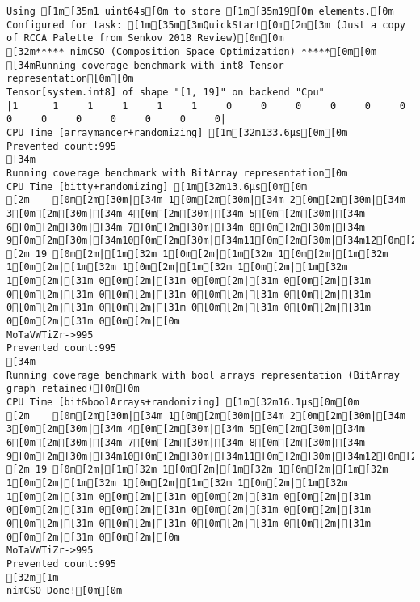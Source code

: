 \begin{verbatim}
Using [1m[35m1 uint64s[0m to store [1m[35m19[0m elements.[0m
Configured for task: [1m[35m[3mQuickStart[0m[2m[3m (Just a copy of RCCA Palette from Senkov 2018 Review)[0m[0m
[32m***** nimCSO (Composition Space Optimization) *****[0m[0m
[34mRunning coverage benchmark with int8 Tensor representation[0m[0m
Tensor[system.int8] of shape "[1, 19]" on backend "Cpu"
|1      1     1     1     1     1     0     0     0     0     0     0     0     0     0     0     0     0     0|
CPU Time [arraymancer+randomizing] [1m[32m133.6μs[0m[0m
Prevented count:995
[34m
Running coverage benchmark with BitArray representation[0m
CPU Time [bitty+randomizing] [1m[32m13.6μs[0m[0m
[2m    [0m[2m[30m|[34m 1[0m[2m[30m|[34m 2[0m[2m[30m|[34m 3[0m[2m[30m|[34m 4[0m[2m[30m|[34m 5[0m[2m[30m|[34m 6[0m[2m[30m|[34m 7[0m[2m[30m|[34m 8[0m[2m[30m|[34m 9[0m[2m[30m|[34m10[0m[2m[30m|[34m11[0m[2m[30m|[34m12[0m[2m[30m|[34m13[0m[2m[30m|[34m14[0m[2m[30m|[34m15[0m[2m[30m|[34m16[0m[2m[30m|[34m17[0m[2m[30m|[34m18[0m[2m[30m|[34m19[0m[2m|[0m
[2m 19 [0m[2m|[1m[32m 1[0m[2m|[1m[32m 1[0m[2m|[1m[32m 1[0m[2m|[1m[32m 1[0m[2m|[1m[32m 1[0m[2m|[1m[32m 1[0m[2m|[31m 0[0m[2m|[31m 0[0m[2m|[31m 0[0m[2m|[31m 0[0m[2m|[31m 0[0m[2m|[31m 0[0m[2m|[31m 0[0m[2m|[31m 0[0m[2m|[31m 0[0m[2m|[31m 0[0m[2m|[31m 0[0m[2m|[31m 0[0m[2m|[31m 0[0m[2m|[0m
MoTaVWTiZr->995
Prevented count:995
[34m
Running coverage benchmark with bool arrays representation (BitArray graph retained)[0m[0m
CPU Time [bit&boolArrays+randomizing] [1m[32m16.1μs[0m[0m
[2m    [0m[2m[30m|[34m 1[0m[2m[30m|[34m 2[0m[2m[30m|[34m 3[0m[2m[30m|[34m 4[0m[2m[30m|[34m 5[0m[2m[30m|[34m 6[0m[2m[30m|[34m 7[0m[2m[30m|[34m 8[0m[2m[30m|[34m 9[0m[2m[30m|[34m10[0m[2m[30m|[34m11[0m[2m[30m|[34m12[0m[2m[30m|[34m13[0m[2m[30m|[34m14[0m[2m[30m|[34m15[0m[2m[30m|[34m16[0m[2m[30m|[34m17[0m[2m[30m|[34m18[0m[2m[30m|[34m19[0m[2m|[0m
[2m 19 [0m[2m|[1m[32m 1[0m[2m|[1m[32m 1[0m[2m|[1m[32m 1[0m[2m|[1m[32m 1[0m[2m|[1m[32m 1[0m[2m|[1m[32m 1[0m[2m|[31m 0[0m[2m|[31m 0[0m[2m|[31m 0[0m[2m|[31m 0[0m[2m|[31m 0[0m[2m|[31m 0[0m[2m|[31m 0[0m[2m|[31m 0[0m[2m|[31m 0[0m[2m|[31m 0[0m[2m|[31m 0[0m[2m|[31m 0[0m[2m|[31m 0[0m[2m|[0m
MoTaVWTiZr->995
Prevented count:995
[32m[1m
nimCSO Done![0m[0m
\end{verbatim}

